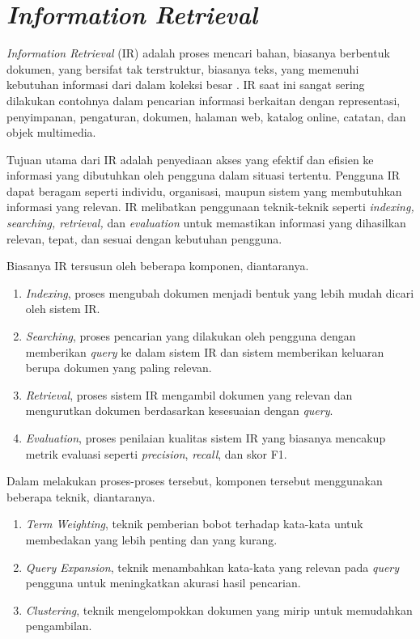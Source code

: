 \section{\textit{Information Retrieval}}
\textit{Information Retrieval} (IR) adalah proses mencari bahan, biasanya berbentuk dokumen, yang bersifat tak terstruktur, biasanya teks, yang memenuhi kebutuhan informasi dari dalam koleksi besar \parencite{introtoinforetri}. IR saat ini sangat sering dilakukan contohnya dalam pencarian informasi berkaitan dengan representasi, penyimpanan, pengaturan, dokumen, halaman web, katalog online, catatan, dan objek multimedia. 

Tujuan utama dari IR adalah penyediaan akses yang efektif dan efisien ke informasi yang dibutuhkan oleh pengguna dalam situasi tertentu. Pengguna IR dapat beragam seperti individu, organisasi, maupun sistem yang membutuhkan informasi yang relevan. IR melibatkan penggunaan teknik-teknik seperti \textit{indexing, searching, retrieval,} dan \textit{evaluation} untuk memastikan informasi yang dihasilkan relevan, tepat, dan sesuai dengan kebutuhan pengguna.

Biasanya IR tersusun oleh beberapa komponen, diantaranya.
\begin{enumerate}
    \item \textit{Indexing}, proses mengubah dokumen menjadi bentuk yang lebih mudah dicari oleh sistem IR.
    \item \textit{Searching}, proses pencarian yang dilakukan oleh pengguna dengan memberikan \textit{query} ke dalam sistem IR dan sistem memberikan keluaran berupa dokumen yang paling relevan.
    \item \textit{Retrieval}, proses sistem IR mengambil dokumen yang relevan dan mengurutkan dokumen berdasarkan kesesuaian dengan \textit{query}.
    \item \textit{Evaluation}, proses penilaian kualitas sistem IR yang biasanya mencakup metrik evaluasi seperti \textit{precision}, \textit{recall}, dan skor F1. 
\end{enumerate}

Dalam melakukan proses-proses tersebut, komponen tersebut menggunakan beberapa teknik, diantaranya.
\begin{enumerate}
    \item \textit{Term Weighting}, teknik pemberian bobot terhadap kata-kata untuk membedakan yang lebih penting dan yang kurang.
    \item \textit{Query Expansion}, teknik menambahkan kata-kata yang relevan pada \textit{query} pengguna untuk meningkatkan akurasi hasil pencarian.
    \item \textit{Clustering}, teknik mengelompokkan dokumen yang mirip untuk memudahkan pengambilan.
\end{enumerate}